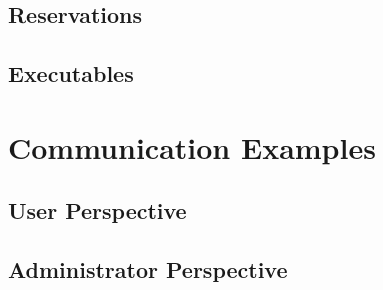 \section{Reservations}

\section{Executables}



\chapter{Communication Examples} 

\section{User Perspective}

\section{Administrator Perspective}

\nocite{*}




